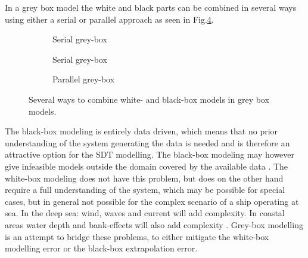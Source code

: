 \noindent In a grey box model the white and black parts can be combined in several ways using either a serial or parallel approach \cite{leifsson_grey-box_2008} as seen in Fig.\ref{fig:greycombinations}. 

\begin{figure}[H]
    \centering
    \begin{subfigure}[b]{0.3\textwidth}
    \centering
    \caption{Serial grey-box}
    \label{fig:serial1}
    \end{subfigure}

    
    \begin{subfigure}[b]{0.3\textwidth}
    \centering
    \caption{Serial grey-box}
    \label{fig:serial2}
    \end{subfigure}

    \begin{subfigure}[b]{0.3\textwidth}
    \centering
    \caption{Parallel grey-box}
    \label{fig:parallel}
    \end{subfigure}
    \caption{Several ways to combine white- and black-box models in grey box models.}
    \label{fig:greycombinations}
\end{figure}

\noindent The black-box modeling is entirely data driven, which means that no prior understanding of the system generating the data is needed and is therefore an attractive option for the SDT modelling. The black-box modeling may however give infeasible models outside the domain covered by the available data \cite{nielsen_machine_2022}. The white-box modeling does not have this problem, but does on the other hand require a full understanding of the system, which may be possible for special cases, but in general not possible for the complex scenario of a ship operating at sea. In the deep sea: wind, waves and current will add complexity. In coastal areas water depth and bank-effects will also add complexity \cite{nielsen_machine_2022}. 
\noindent Grey-box modelling is an attempt to bridge these problems, to either mitigate the white-box modelling error or the black-box extrapolation error.

